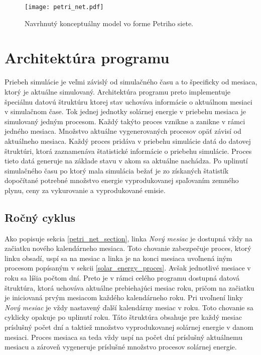 \documentclass[a4paper, 11pt]{article}
\begin{document}
\begin{figure}[h] 
	\centering
	\texttt{[image: petri\_net.pdf]}
	\caption{Navrhnutý konceptuálny model vo forme Petriho siete.}
	\label{obr1}
\end{figure} \label{obr_petri_net}

\section{Architektúra programu}
Priebeh simulácie je veľmi závislý od simulačného času a to špecificky od mesiaca, ktorý je aktuálne simulovaný. Architektúra programu preto implementuje špeciálnu datovú štruktúru ktorej stav uchováva informácie o aktuálnom mesiaci v simulačnom čase. Tok jednej jednotky solárnej energie v priebehu mesiaca je simulovaný jedným procesom. Každý takýto proces vznikne a zanikne v rámci jedného mesiaca. Množstvo aktuálne vygenerovaných procesov opäť závisí od aktuálneho mesiaca. Každý proces pridáva v priebehu simulácie datá do datovej štruktúri, ktorá zaznamenáva štatistické informácie o priebehu simulácie. Proces tieto datá generuje na základe stavu v akom sa aktuálne nachádza. Po uplinutí simulačného času po ktorý mala simulácia bežať je zo získaných štatistík dopočítané potrebné množstvo energie vyprodukovanej spaľovaním zemného plynu, ceny za vykurovanie a vyprodukované emisie.

\subsection{Ročný cyklus}
Ako popisuje sekcia \ref{petri_net_section}, linka \textit{Nový mesiac} je dostupná vždy na začiatku nového kalendárneho mesiaca. Toto chovanie zabezpečuje proces, ktorý linku obsadí, uspí sa na mesiac a linka je na konci mesiaca uvoľnená iným procesom popísaným v sekcii \ref{solar_energy_proces}. Avšak jednotlivé mesiace v roku sa líšia počtom dní. Preto je v rámci celého programu dostupná datová štruktúra, ktorá uchováva aktuálne prebiehajúci mesiac roku, pričom na začiatku je iniciovaná prvým mesiacom každého kalendárneho roku. Pri uvoľnení linky \textit{Nový mesiac} je vždy nastavený ďalší kalendárny mesiac v roku. Toto chovanie sa cyklicky opakuje po uplinutí roku. Táto štruktúra obsahuje pre každý mesiac príslušný počet dní a taktiež množstvo vyprodukovanej solárnej energie v danom mesiaci. Proces mesiaca sa teda vždy uspí na počet dní príslušný aktuálnemu mesiacu a zároveň vygeneruje príslušné množstvo procesov solárnej energie.
\end{document}
